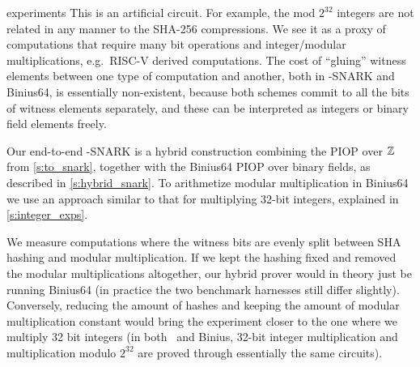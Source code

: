 \begin{lncsappendix}{experiments}
This is an artificial circuit. For example, the mod $2^{32}$ integers are not related in any manner to the SHA-256 compressions. We see it as a proxy of computations that require many bit operations and integer/modular multiplications, e.g.\ RISC-V derived computations. The cost of ``gluing'' witness elements between one type of computation and another, both in \ftwoz-SNARK and Binius64, is essentially non-existent, because  both schemes commit to all the bits of witness elements separately, and these can be interpreted as  integers or binary field elements freely.

Our end-to-end \ftwoz-SNARK is a hybrid construction combining the PIOP over $\mathbb{Z}$ from \cref{s:to_snark}, together with the Binius64 PIOP over binary fields, as  described in \cref{s:hybrid_snark}.    To arithmetize modular multiplication in Binius64  we use an approach similar to that for multiplying 32-bit integers, explained in \cref{s:integer_exps}.

We measure computations where the witness bits are evenly split between  SHA hashing and modular multiplication. If we kept the hashing fixed and removed the modular multiplications altogether, our hybrid prover would in theory just be running Binius64 (in practice the two benchmark harnesses still differ slightly). Conversely, reducing the amount of hashes and keeping the amount of modular multiplication constant would bring the experiment closer to the one where we multiply 32 bit integers (in both \ftwoz\ and Binius, 32-bit integer multiplication and multiplication modulo $2^{32}$ are proved through essentially the same circuits).


\end{lncsappendix}
